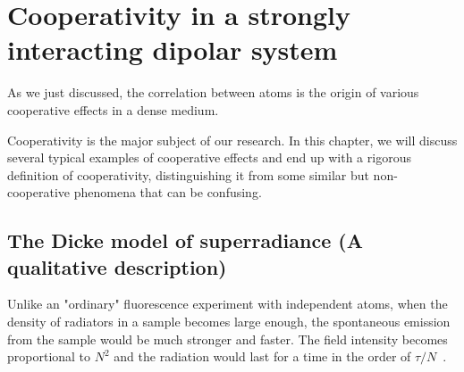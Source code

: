 \chapter{Cooperativity in a strongly interacting dipolar system}

As we just discussed, the correlation between atoms is the origin of various cooperative effects in a dense medium.


Cooperativity is the major subject of our research. In this chapter, we will discuss several typical examples of cooperative effects and end up with a rigorous definition of cooperativity,  distinguishing it from some similar but non-cooperative phenomena that can be confusing.

\section{The Dicke model of superradiance (A qualitative description)}
Unlike an "ordinary" fluorescence experiment with independent atoms, when the density of radiators in a sample becomes large enough, the spontaneous emission from the sample would be much stronger and faster.  The field intensity becomes proportional to $N^2$ and the radiation would last for a time in the order of $\tau/N$~\cite{0038-5670-23-8-R04,1982PhR....93..301G}. 


